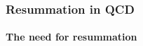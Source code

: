 \documentclass[aspectratio=43]{beamer}
\begin{document}
%
%

\begin{frame}


\end{frame}

\begin{frame}
	
	\frametitle{Resummation in QCD}
	\framesubtitle{The need for resummation}

\end{frame}
\end{document}
